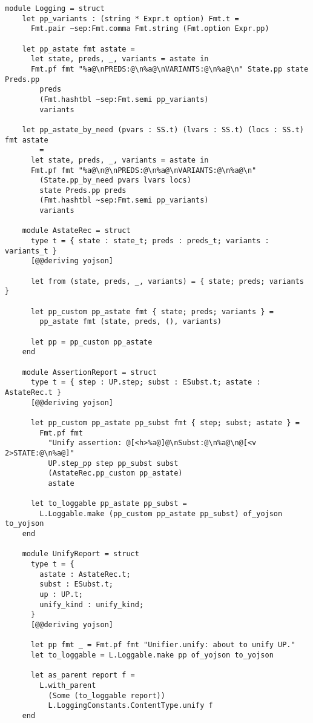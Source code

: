 \begin{lstlisting}[caption={
  Logging types for unification, inside the \texttt{Unifier} module
  \label{lst:unifier-logging}}, style=code]
  module Logging = struct
    let pp_variants : (string * Expr.t option) Fmt.t =
      Fmt.pair ~sep:Fmt.comma Fmt.string (Fmt.option Expr.pp)

    let pp_astate fmt astate =
      let state, preds, _, variants = astate in
      Fmt.pf fmt "%a@\nPREDS:@\n%a@\nVARIANTS:@\n%a@\n" State.pp state Preds.pp
        preds
        (Fmt.hashtbl ~sep:Fmt.semi pp_variants)
        variants

    let pp_astate_by_need (pvars : SS.t) (lvars : SS.t) (locs : SS.t) fmt astate
        =
      let state, preds, _, variants = astate in
      Fmt.pf fmt "%a@\n@\nPREDS:@\n%a@\nVARIANTS:@\n%a@\n"
        (State.pp_by_need pvars lvars locs)
        state Preds.pp preds
        (Fmt.hashtbl ~sep:Fmt.semi pp_variants)
        variants

    module AstateRec = struct
      type t = { state : state_t; preds : preds_t; variants : variants_t }
      [@@deriving yojson]

      let from (state, preds, _, variants) = { state; preds; variants }

      let pp_custom pp_astate fmt { state; preds; variants } =
        pp_astate fmt (state, preds, (), variants)

      let pp = pp_custom pp_astate
    end

    module AssertionReport = struct
      type t = { step : UP.step; subst : ESubst.t; astate : AstateRec.t }
      [@@deriving yojson]

      let pp_custom pp_astate pp_subst fmt { step; subst; astate } =
        Fmt.pf fmt
          "Unify assertion: @[<h>%a@]@\nSubst:@\n%a@\n@[<v 2>STATE:@\n%a@]"
          UP.step_pp step pp_subst subst
          (AstateRec.pp_custom pp_astate)
          astate

      let to_loggable pp_astate pp_subst =
        L.Loggable.make (pp_custom pp_astate pp_subst) of_yojson to_yojson
    end

    module UnifyReport = struct
      type t = {
        astate : AstateRec.t;
        subst : ESubst.t;
        up : UP.t;
        unify_kind : unify_kind;
      }
      [@@deriving yojson]

      let pp fmt _ = Fmt.pf fmt "Unifier.unify: about to unify UP."
      let to_loggable = L.Loggable.make pp of_yojson to_yojson

      let as_parent report f =
        L.with_parent
          (Some (to_loggable report))
          L.LoggingConstants.ContentType.unify f
    end


\end{lstlisting}
